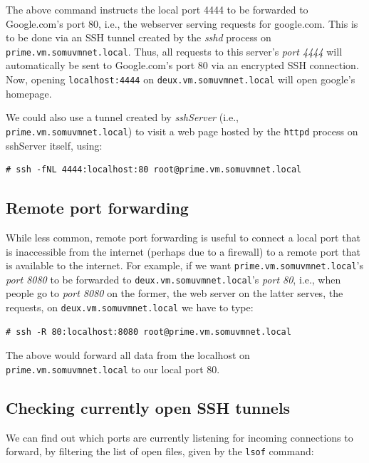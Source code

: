\noindent
The above command instructs the local port 4444 to be forwarded to Google.com's port 80, i.e., the webserver serving requests for google.com. This is to be done via an SSH tunnel created by the \textit{sshd} process on \verb|prime.vm.somuvmnet.local|. Thus, all requests to this server's \textit{port 4444} will automatically be sent to Google.com's port 80 via an encrypted SSH connection. Now, opening \verb|localhost:4444| on \verb|deux.vm.somuvmnet.local| will open google's homepage. 

We could also use a tunnel created by \textit{sshServer} (i.e., \verb|prime.vm.somuvmnet.local|) to visit a web page hosted by the \verb|httpd| process on sshServer itself, using:

\vspace{-15pt}
\begin{verbatim}
# ssh -fNL 4444:localhost:80 root@prime.vm.somuvmnet.local
\end{verbatim}
\vspace{-10pt}	

\subsection{Remote port forwarding}
While less common, remote port forwarding is useful to connect a local port that is inaccessible from the internet (perhaps due to a firewall) to a remote port that is available to the internet. For example, if we want \verb|prime.vm.somuvmnet.local|'s \textit{port 8080} to be forwarded to \verb|deux.vm.somuvmnet.local|'s \textit{port 80}, i.e., when people go to \textit{port 8080} on the former, the web server on the latter serves, the requests, on \verb|deux.vm.somuvmnet.local| we have to type:

\vspace{-15pt}
\begin{verbatim}
# ssh -R 80:localhost:8080 root@prime.vm.somuvmnet.local
\end{verbatim}
\vspace{-10pt}	

\noindent
The above would forward all data from the localhost on \verb|prime.vm.somuvmnet.local| to our local port 80. 

\subsection{Checking currently open SSH tunnels}
We can find out which ports are currently listening for incoming connections to forward, by filtering the list of open files, given by the \verb|lsof| command:


